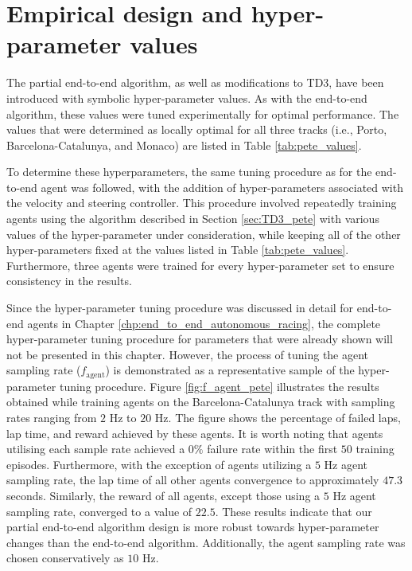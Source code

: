 

\section{Empirical design and hyper-parameter values}

The partial end-to-end algorithm, as well as modifications to TD3, have been introduced with symbolic hyper-parameter values.
As with the end-to-end algorithm, these values were tuned experimentally for optimal performance.
The values that were determined as locally optimal for all three tracks (i.e., Porto, Barcelona-Catalunya, and Monaco) are listed in Table \ref{tab:pete_values}.



To determine these hyperparameters, the same tuning procedure as for the end-to-end agent was followed, 
with the addition of hyper-parameters associated with the velocity and steering controller.
This procedure involved repeatedly training agents using the algorithm described in Section \ref{sec:TD3_pete}
with various values of the hyper-parameter under consideration, while keeping all of the other hyper-parameters fixed at the values listed in Table \ref{tab:pete_values}.
Furthermore, three agents were trained for every hyper-parameter set to ensure consistency in the results.


Since the hyper-parameter tuning procedure was discussed in detail for end-to-end agents in Chapter \ref{chp:end_to_end_autonomous_racing}, the complete hyper-parameter tuning procedure for parameters that were already shown will not be presented in this chapter. 
However, the process of tuning the agent sampling rate ($f_{\text{agent}}$) is demonstrated as a representative sample of the hyper-parameter tuning procedure.
Figure \ref{fig:f_agent_pete} illustrates the results obtained while training agents on the Barcelona-Catalunya track with sampling rates ranging from $2$ Hz to $20$ Hz. 
The figure shows the percentage of failed laps, lap time, and reward achieved by these agents. 
It is worth noting that agents utilising each sample rate achieved a $0\%$ failure rate within the first $50$ training episodes.
Furthermore, with the exception of agents utilizing a $5$ Hz agent sampling rate, the lap time of all other agents convergence to approximately $47.3$ seconds. 
Similarly, the reward of all agents, except those using a $5$ Hz agent sampling rate, converged to a value of $22.5$.
These results indicate that our partial end-to-end algorithm design is more robust towards hyper-parameter changes than the end-to-end algorithm.
Additionally, the agent sampling rate was chosen conservatively as $10$ Hz.

